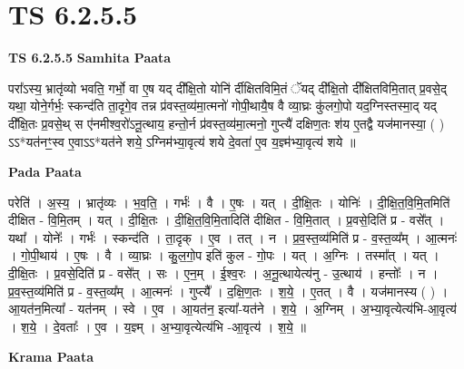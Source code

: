 \documentclass[17pt]{extarticle}
\begin{document}
\section{ TS 6.2.5.5 }

\textbf{TS 6.2.5.5 } \newline
\textbf{Samhita Paata} \newline

परा᳚ऽस्य॒ भ्रातृ॑व्यो भवति॒ गर्भो॒ वा ए॒ष यद् दी᳚क्षि॒तो योनि॑ र्दीक्षितविमि॒तं ॅयद् दी᳚क्षि॒तो दी᳚क्षितविमि॒तात् प्र॒वसे॒द् यथा॒ योने॒र्गर्भः॒ स्कन्द॑ति ता॒दृगे॒व तन्न प्र॑वस्त॒व्य॑मा॒त्मनो॑ गोपी॒थायै॒ष वै व्या॒घ्रः कु॑लगो॒पो यद॒ग्निस्तस्मा॒द् यद् दी᳚क्षि॒तः प्र॒वसे॒थ् स ए॑नमीश्व॒रो॑ऽनू॒त्थाय॒ हन्तो॒र्न प्र॑वस्त॒व्य॑मा॒त्मनो॒ गुप्त्यै॑ दक्षिण॒तः श॑य ए॒तद्वै यज॑मानस्या॒ ( ) ऽऽ*यत॑नꣳ॒॒स्व ए॒वाऽऽ*यत॑ने शये॒ ऽग्निम॑भ्या॒वृत्य॑ शये दे॒वता॑ ए॒व य॒ज्ञ्म॑भ्या॒वृत्य॑ शये ॥ \newline

\textbf{Pada Paata} \newline

परेति॑ । अ॒स्य॒ । भ्रातृ॑व्यः । भ॒व॒ति॒ । गर्भः॑ । वै । ए॒षः । यत् । दी॒क्षि॒तः । योनिः॑ । दी॒क्षि॒त॒वि॒मि॒तमिति॑ दीक्षित - वि॒मि॒तम् । यत् । दी॒क्षि॒तः । दी॒क्षि॒त॒वि॒मि॒तादिति॑ दीक्षित - वि॒मि॒तात् । प्र॒वसे॒दिति॑ प्र - वसे᳚त् । यथा᳚ । योनेः᳚ । गर्भः॑ । स्कन्द॑ति । ता॒दृक् । ए॒व । तत् । न । प्र॒व॒स्त॒व्य॑मिति॑ प्र - व॒स्त॒व्य᳚म् । आ॒त्मनः॑ । गो॒पी॒थाय॑ । ए॒षः । वै । व्या॒घ्रः । कु॒ल॒गो॒प इति॑ कुल - गो॒पः । यत् । अ॒ग्निः । तस्मा᳚त् । यत् । दी॒क्षि॒तः । प्र॒वसे॒दिति॑ प्र - वसे᳚त् । सः । ए॒न॒म् । ई॒श्व॒रः । अ॒नू॒त्थायेत्य॑नु - उ॒त्थाय॑ । हन्तोः᳚ । न । प्र॒व॒स्त॒व्य॑मिति॑ प्र - व॒स्त॒व्य᳚म् । आ॒त्मनः॑ । गुप्त्यै᳚ । द॒क्षि॒ण॒तः । श॒ये॒ । ए॒तत् । वै । यज॑मानस्य ( ) । आ॒यत॑न॒मित्या᳚ - यत॑नम् । स्वे । ए॒व । आ॒यत॑न॒ इत्या᳚-यत॑ने । श॒ये॒ । अ॒ग्निम् । अ॒भ्या॒वृत्येत्य॑भि-आ॒वृत्य॑ । श॒ये॒ । दे॒वताः᳚ । ए॒व । य॒ज्ञ्म् । अ॒भ्या॒वृत्येत्य॑भि -आ॒वृत्य॑ । श॒ये॒ ॥  \newline


\textbf{Krama Paata} \newline
\end{document}
